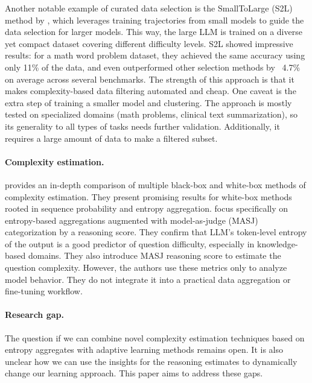 Another notable example of curated data selection is the SmallToLarge (S2L) method by \citet{yang2024smalltolarges2lscalabledata}, which leverages training trajectories from small models to guide the data selection for larger models. This way, the large LLM is trained on a diverse yet compact dataset covering different difficulty levels. S2L showed impressive results: for a math word problem dataset, they achieved the same accuracy using only 11\% of the data, and even outperformed other selection methods by ~4.7\% on average across several benchmarks. The strength of this approach is that it makes complexity-based data filtering automated and cheap. One caveat is the extra step of training a smaller model and clustering. The approach is mostly tested on specialized domains (math problems, clinical text summarization), so its generality to all types of tasks needs further validation. Additionally, it requires a large amount of data to make a filtered subset.


\paragraph{Complexity estimation.}
\citet{fadeeva2023lmpolygraphuncertaintyestimationlanguage} provides an in-depth comparison of multiple black-box and white-box methods of complexity estimation. They present promising results for white-box methods rooted in sequence probability and entropy aggregation. \citet{sychev2025llmapprehensiveanswers} focus specifically on entropy-based aggregations augmented with model-as-judge (MASJ) categorization by a reasoning score. They confirm that LLM's token-level entropy of the output is a good predictor of question difficulty, especially in knowledge-based domains. They also introduce MASJ reasoning score to estimate the question complexity. However, the authors use these metrics only to analyze model behavior. They do not integrate it into a practical data aggregation or fine-tuning workflow.

\paragraph{Research gap.} The question if we can combine novel complexity estimation techniques based on entropy aggregates with adaptive learning methods remains open. It is also unclear how we can use the insights for the reasoning estimates to dynamically change our learning approach. This paper aims to address these gaps.